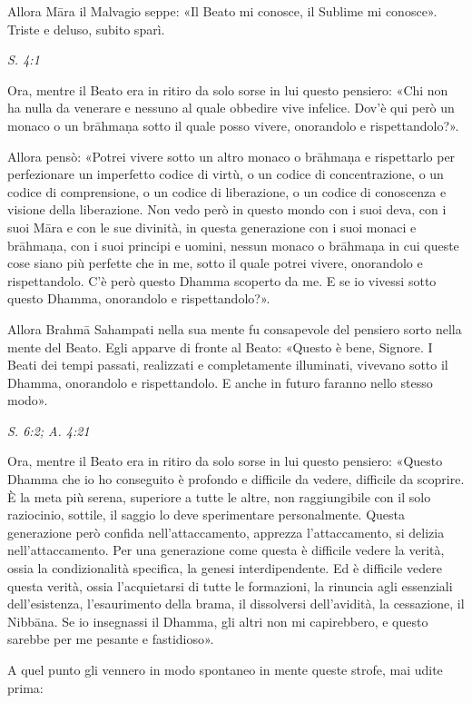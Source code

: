 Allora Māra il Malvagio seppe: «Il Beato mi conosce, il Sublime mi
conosce». Triste e deluso, subito sparì.


\emph{S. 4:1}


Ora, mentre il Beato era in ritiro da solo sorse in lui questo pensiero:
«Chi non ha nulla da venerare e nessuno al quale obbedire vive infelice.
Dov’è qui però un monaco o un brāhmaṇa sotto il quale posso vivere,
onorandolo e rispettandolo?».


Allora pensò: «Potrei vivere sotto un altro monaco o brāhmaṇa e
rispettarlo per perfezionare un imperfetto codice di virtù, o un codice
di concentrazione, o un codice di comprensione, o un codice di
liberazione, o un codice di conoscenza e visione della liberazione. Non
vedo però in questo mondo con i suoi deva, con i suoi Māra e con le sue
divinità, in questa generazione con i suoi monaci e brāhmaṇa, con i suoi
principi e uomini, nessun monaco o brāhmaṇa in cui queste cose siano più
perfette che in me, sotto il quale potrei vivere, onorandolo e
rispettandolo. C’è però questo Dhamma scoperto da me. E se io vivessi
sotto questo Dhamma, onorandolo e rispettandolo?».


Allora Brahmā Sahampati nella sua mente fu consapevole del pensiero
sorto nella mente del Beato. Egli apparve di fronte al Beato: «Questo è
bene, Signore. I Beati dei tempi passati, realizzati e completamente
illuminati, vivevano sotto il Dhamma, onorandolo e rispettandolo. E
anche in futuro faranno nello stesso modo».


\emph{S. 6:2; A. 4:21}


 Ora, mentre il Beato era in ritiro da solo sorse in lui
questo pensiero: «Questo Dhamma che io ho conseguito è profondo e
difficile da vedere, difficile da scoprire. È la meta più serena,
superiore a tutte le altre, non raggiungibile con il solo raziocinio,
sottile, il saggio lo deve sperimentare personalmente. Questa
generazione però confida nell’attaccamento, apprezza l’attaccamento, si
delizia nell’attaccamento. Per una generazione come questa è difficile
vedere la verità, ossia la condizionalità specifica, la genesi
interdipendente. Ed è difficile vedere questa verità, ossia
l’acquietarsi di tutte le formazioni, la rinuncia agli essenziali
dell’esistenza, l’esaurimento della brama, il dissolversi dell’avidità,
la cessazione, il Nibbāna. Se io insegnassi il Dhamma, gli altri non mi
capirebbero, e questo sarebbe per me pesante e fastidioso».


A quel punto gli vennero in modo spontaneo in mente queste strofe, mai
udite prima:



